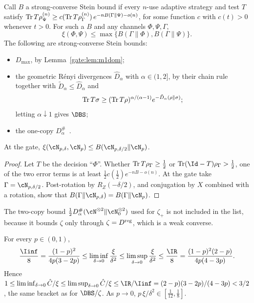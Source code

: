 \begin{lemma}\label{gate:lem:m1mid}
Call $B$ a strong-converse Stein bound if every $n$-use adaptive strategy and test $T$ satisfy $\operatorname{Tr} T\rho^{(n)}_\Psi\ge c(\operatorname{Tr} T\rho^{(n)}_\Gamma)\,e^{-nB(\Gamma\|\Psi)-o(n)}$, for some function $c$ with $c(t)>0$ whenever $t>0$. For such a $B$ and any channels $\Phi,\Psi,\Gamma$,
\begin{equation}
\xi(\Phi,\Psi)\le\max\{B(\Gamma\|\Phi),B(\Gamma\|\Psi)\}.
\end{equation}
The following are strong-converse Stein bounds:
\begin{itemize}
\item $D_{\max}$, by Lemma~\ref{gate:lem:m1dom};
\item the geometric R\'enyi divergences $\hat D_\alpha$ with $\alpha\in(1,2]$, by their chain rule~\cite{FangFawzi2021} together with $\tilde D_\alpha\le\hat D_\alpha$ and
\begin{equation*}
\operatorname{Tr} T\sigma\ge(\operatorname{Tr} T\rho)^{\alpha/(\alpha-1)}e^{-\tilde D_\alpha(\rho\|\sigma)};
\end{equation*} letting $\alpha\downarrow1$ gives $\DBS$;
\item the one-copy $D^\#_\alpha$~\cite{FawziFawzi2021}.
\end{itemize}
At the gate, $\xi(\cN_{p,\delta},\cN_p)\le B(\cN_{p,\delta/2}\|\cN_p)$.
\end{lemma}

\begin{proof}
Let $T$ be the decision ``$\Phi$''. Whether $\operatorname{Tr} T\rho_\Gamma\ge\frac12$ or $\Tr(\Id-T)\rho_\Gamma>\frac12$, one of the two error terms is at least $\frac12c(\frac12)e^{-nB-o(n)}$. At the gate take $\Gamma=\cN_{p,\delta/2}$. Post-rotation by $R_Z(-\delta/2)$, and conjugation by $X$ combined with a rotation, show that $B(\Gamma\|\cN_{p,\delta})=B(\Gamma\|\cN_p)$.
\end{proof}

The two-copy bound $\frac12D^\#_\alpha(\cN^{\otimes2}\|\cN_0^{\otimes2})$ used for $\zeta_+$ is not included in the list, because it bounds $\zeta$ only through $\zeta=D^{\rm reg}$, which is a weak converse.

\begin{proposition}\label{gate:prop:m1local}
For every $p\in(0,1)$,
\begin{equation}\label{gate:eq:m1local}
\frac{\Iinf}{8}=\frac{(1-p)^2}{4p(3-2p)}\le\liminf_{\delta\to0}\frac{\xi}{\delta^2}\le\limsup_{\delta\to0}\frac{\xi}{\delta^2}\le\frac{\IR}{8}=\frac{(1-p)^2(2-p)}{4p(4-3p)}.
\end{equation}
Hence $1\le\liminf_{\delta\to0}\hat C/\xi\le\limsup_{\delta\to0}\hat C/\xi\le\IR/\Iinf=(2-p)(3-2p)/(4-3p)<3/2$, the same bracket as for $\DBS/\zeta$. As $p\to0$, $p\,\xi/\delta^2\in[\frac1{12},\frac18]$.
\end{proposition}

